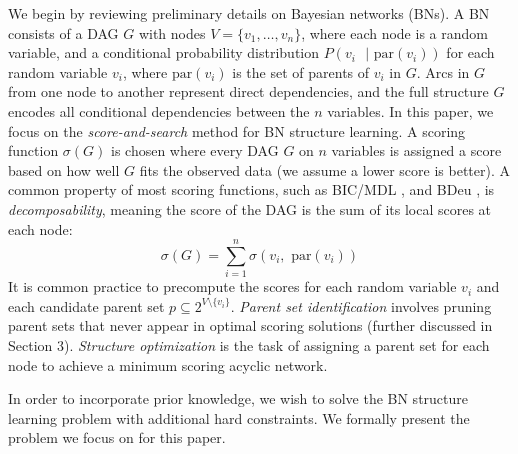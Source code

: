 \documentclass[twoside,11pt]{article}
\begin{document}
We begin by reviewing preliminary details on Bayesian networks (BNs). 
A BN consists of a DAG $G$ with nodes $V = \{v_1, \ldots , v_n\}$, where each node is a random variable, and a conditional probability distribution
$P(v_i \text{ }| \text{ par}(v_i))$ for each random variable $v_i$, where $\text{par}(v_i)$ is the set of parents of $v_i$ in $G$. Arcs in $G$ from one node to another
represent direct dependencies, and the full structure $G$ encodes all conditional dependencies between the $n$ variables. 
In this paper, we focus on the \emph{score-and-search} method for BN structure learning. A scoring function $\sigma( \mathit{G} )$ is chosen where
every DAG $G$ on $n$ variables is assigned a score based on how well $G$ fits the observed data (we assume a lower score is better).
A common property of most scoring functions, such as BIC/MDL \citep{Schwarz78}, and BDeu \citep{HeckermanGC95}, is \emph{decomposability}, meaning the score of 
the DAG is the sum of its local scores at each node: 
$$\sigma( \mathit{G} ) = \sum_{i = 1}^{n} \sigma(v_i,\text{ par}(v_i))$$
It is common practice to precompute the scores for each random variable $v_i$ and each candidate parent set $p \subseteq 2^{V \setminus \{v_i\} }$. \emph{Parent set
identification} involves pruning parent sets that never appear in optimal scoring solutions (further 
discussed in Section 3). \emph{Structure optimization} is the task of assigning a parent set for each node to achieve a minimum scoring acyclic network.

\smallskip
In order to incorporate prior knowledge, we wish to solve the BN structure learning problem with additional hard constraints. We formally present the problem we focus on for this paper.
\end{document}
